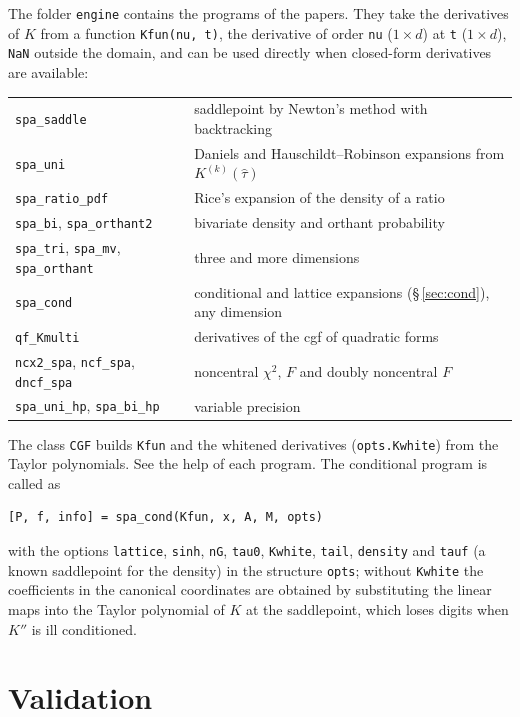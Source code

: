 \documentclass[11pt]{article}
\newcommand{\prog}[1]{\texttt{#1}}
\begin{document}
The folder \prog{engine} contains the programs of the papers. They take the derivatives of $K$ from a
function \prog{Kfun(nu, t)}, the derivative of order \prog{nu} ($1\times d$) at \prog{t}
($1\times d$), \prog{NaN} outside the domain, and can be used directly when closed-form derivatives
are available:
\begin{center}
\begin{tabular}{@{}ll@{}}
\toprule
\prog{spa\_saddle} & saddlepoint by Newton's method with backtracking\\
\prog{spa\_uni} & Daniels and Hauschildt--Robinson expansions from $K^{(k)}(\hat\tau)$\\
\prog{spa\_ratio\_pdf} & Rice's expansion of the density of a ratio\\
\prog{spa\_bi}, \prog{spa\_orthant2} & bivariate density and orthant probability\\
\prog{spa\_tri}, \prog{spa\_mv}, \prog{spa\_orthant} & three and more dimensions\\
\prog{spa\_cond} & conditional and lattice expansions (\S\,\ref{sec:cond}), any dimension\\
\prog{qf\_Kmulti} & derivatives of the cgf of quadratic forms\\
\prog{ncx2\_spa}, \prog{ncf\_spa}, \prog{dncf\_spa} & noncentral $\chi^2$, $F$ and doubly noncentral $F$\\
\prog{spa\_uni\_hp}, \prog{spa\_bi\_hp} & variable precision\\
\bottomrule
\end{tabular}
\end{center}
The class \prog{CGF} builds \prog{Kfun} and the whitened derivatives (\prog{opts.Kwhite}) from the
Taylor polynomials. See the help of each program. The conditional program is called as
\begin{lstlisting}
[P, f, info] = spa_cond(Kfun, x, A, M, opts)
\end{lstlisting}
with the options \prog{lattice}, \prog{sinh}, \prog{nG}, \prog{tau0}, \prog{Kwhite}, \prog{tail},
\prog{density} and \prog{tauf} (a known saddlepoint for the density) in the structure \prog{opts};
without \prog{Kwhite} the coefficients in the canonical coordinates are obtained by substituting the
linear maps into the Taylor polynomial of $K$ at the saddlepoint, which loses digits when $K''$ is
ill conditioned.

\section{Validation}\label{sec:valid}
\end{document}
